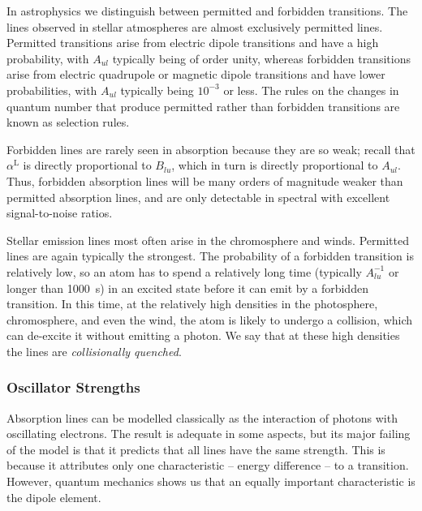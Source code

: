 In astrophysics we distinguish between permitted and
forbidden transitions. The lines observed in stellar
atmospheres are almost exclusively permitted lines.
Permitted transitions arise from electric dipole transitions
and have a high probability, with $A_{ul}$ typically being of order unity, whereas forbidden transitions arise from electric
quadrupole or magnetic dipole transitions and have lower
probabilities, with $A_{ul}$ typically being $10^{-3}$ or less. 
The rules on the changes in quantum
number that produce permitted rather than forbidden
transitions are known as selection rules.

Forbidden lines are rarely seen in absorption because they are so weak;
recall that $\alpha^\mathrm{L}$ is directly proportional to $B_{lu}$,
which in turn is directly proportional to $A_{ul}$. Thus, forbidden
absorption lines will be many orders of magnitude weaker than permitted
absorption lines, and are only detectable in spectral with excellent signal-to-noise
ratios.

Stellar emission lines most often arise in the chromosphere
and winds.  Permitted lines
are again typically the strongest. The probability of a forbidden transition is
relatively low, so an atom has to spend a relatively long
time (typically $A_{lu}^{-1}$ or longer than 1000~s) in an excited state
before it can emit by a forbidden transition. In this time,
at the relatively high densities in the photosphere,
chromosphere, and even the wind, the atom is likely to
undergo a collision, which can de-excite it without emitting
a photon. We say that at these high densities the lines are
\emph{collisionally quenched}.

\subsubsection{Oscillator Strengths}

Absorption lines can be modelled classically as the
interaction of photons with oscillating electrons. The
result is adequate in some aspects, but its major failing of
the model is that it predicts that all lines have the same
strength. This is because it attributes only one characteristic -- energy
difference -- to a transition. However, quantum mechanics shows us that an equally important characteristic is the dipole element.

